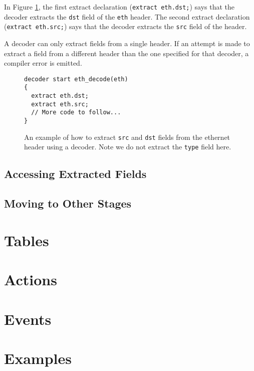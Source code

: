 In Figure \ref{fg:extract_ex}, the first extract declaration (\texttt{extract eth.dst;}) says that the decoder extracts the \texttt{dst} field of the \texttt{eth} header. The second extract declaration (\texttt{extract eth.src;}) says that the decoder extracts the \texttt{src} field of the  header. 

A decoder can only extract fields from a single header. If an attempt is made to extract a field from a different header than the one specified for that decoder, a compiler error is emitted.

\begin{figure}
\begin{lstlisting}
decoder start eth_decode(eth)
{
  extract eth.dst;
  extract eth.src;
  // More code to follow...
}
\end{lstlisting}
\caption{An example of how to extract \texttt{src} and \texttt{dst} fields from the ethernet header using a decoder. Note we do not extract the \texttt{type} field here.}
\label{fg:extract_ex}
\end{figure}

\subsection{Accessing Extracted Fields} \label{decoder_access_tut}

\subsection{Moving to Other Stages} \label{decoder_next_tut}

\section{Tables} \label{table_tut}

\section{Actions} \label{action_tut}

\section{Events} \label{event_tut}

\section{Examples} \label{examples_tut}